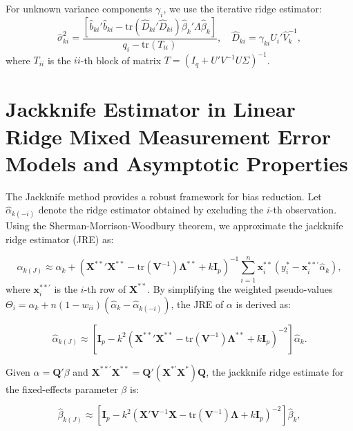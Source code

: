 \documentclass[twoside]{article}
\begin{document}
For unknown variance components $\gamma_i$, we use the iterative ridge estimator:
\begin{equation}
\hat{\sigma}_{ki}^2 = \frac{[\hat{b}_{ki}'\hat{b}_{ki} - \text{tr}(\hat{D}_{ki}'\hat{D}_{ki})\hat{\beta}_k'\Lambda\hat{\beta}_k]}{q_i - \text{tr}(T_{ii})}, \quad \hat{D}_{ki} = \gamma_{ki}U_i'\hat{V}_k^{-1}, 
\end{equation}
where $T_{ii}$ is the $ii$-th block of matrix $T = (I_q + U'V^{-1}U\Sigma)^{-1}$.
\section{Jackknife Estimator in Linear Ridge Mixed Measurement Error Models and Asymptotic Properties}\label{Jackknife}

The Jackknife method provides a robust framework for bias reduction. Let $\hat{\alpha}_{k(-i)}$ denote the ridge estimator obtained by excluding the $i$-th observation. Using the Sherman-Morrison-Woodbury theorem, we approximate the jackknife ridge estimator (JRE) as:

\begin{equation}
\hat{\alpha}_{k(J)} \approx \hat{\alpha}_k + (\mathbf{X^{**}}'\mathbf{X^{**}} - \text{tr}(\mathbf{V}^{-1})\mathbf{\Lambda^{**}} + k\mathbf{I}_p)^{-1} \sum_{i=1}^n \mathbf{x}_i^{**} (y_i^{*} - \mathbf{x}_i^{**'}\hat{\alpha}_k), 
\end{equation}
where $\mathbf{x}_i^{**'}$ is the $i$-th row of $\mathbf{X}^{**}$. By simplifying the weighted pseudo-values\\
 $\Theta_i = \hat{\alpha}_k + n(1-w_{ii})(\hat{\alpha}_k - \hat{\alpha}_{k(-i)})$, the JRE of $\alpha$ is derived as:

\begin{equation}
\hat{\alpha}_{k(J)} \approx [\mathbf{I}_p - k^2(\mathbf{X^{**}}'\mathbf{X^{**}} - \text{tr}(\mathbf{V}^{-1})\mathbf{\Lambda^{**}} + k\mathbf{I}_p)^{-2}] \hat{\alpha}_k. 
\end{equation}

Given $\alpha = \mathbf{Q}'\beta$ and $\mathbf{X}^{**'}\mathbf{X}^{**} = \mathbf{Q}'(\mathbf{X}^{*'}\mathbf{X}^*)\mathbf{Q}$, the jackknife ridge estimate for the fixed-effects parameter $\beta$ is:

\begin{equation}
\hat{\beta}_{k(J)} \approx [\mathbf{I}_p - k^2(\mathbf{X}'\mathbf{V}^{-1}\mathbf{X} - \text{tr}(\mathbf{V}^{-1})\mathbf{\Lambda} + k\mathbf{I}_p)^{-2}] \hat{\beta}_k, 
\end{equation}
\end{document}
